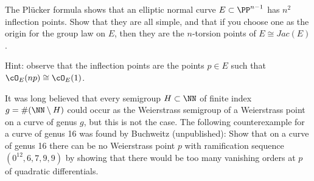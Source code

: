 \begin{exercise}
The Pl\"ucker formula shows that an elliptic normal curve $E\subset
\PP^{n-1}$ has $n^2$ inflection points. Show that they are
all simple, and that if you choose one as the origin for the group law
on $E$, then
they are the $n$-torsion points of  $E \cong Jac(E)$.

Hint: observe that the inflection points are the points $p \in E$ such
that $\cO_E(np) \cong \cO_E(1)$.
\end{exercise}

\begin{exercise}[Buchweitz]
It was long believed that every semigroup $H \subset \NN$ of finite index
%
$g = \#(\NN \setminus H)$ could occur as the Weierstrass semigroup of
a Weierstrass
point on a curve of genus $g$, but this is not the case. The following
counterexample for a curve of genus 16 was found by Buchweitz
%
(unpublished): Show that on a curve of genus 16 there can be no
Weierstrass point $p$ with ramification sequence
$(0^{12}, 6,7,9,9)$ by showing that there would be too many vanishing
orders at $p$ of quadratic differentials.
 \end{exercise}

